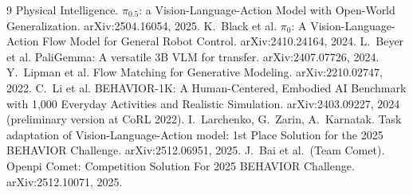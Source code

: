 \documentclass[10pt]{article}
\begin{document}
\begin{thebibliography}{9}\small
{} Physical Intelligence. $\pi_{0.5}$: a Vision-Language-Action Model with Open-World Generalization. arXiv:2504.16054, 2025.
 K.~Black et al. $\pi_0$: A Vision-Language-Action Flow Model for General Robot Control. arXiv:2410.24164, 2024.
 L.~Beyer et al. PaliGemma: A versatile 3B VLM for transfer. arXiv:2407.07726, 2024.
 Y.~Lipman et al. Flow Matching for Generative Modeling. arXiv:2210.02747, 2022.
 C.~Li et al. BEHAVIOR-1K: A Human-Centered, Embodied AI Benchmark with 1,000 Everyday Activities and Realistic Simulation. arXiv:2403.09227, 2024 (preliminary version at CoRL 2022).
 I.~Larchenko, G.~Zarin, A.~Karnatak. Task adaptation of Vision-Language-Action model: 1st Place Solution for the 2025 BEHAVIOR Challenge. arXiv:2512.06951, 2025.
 J.~Bai et al.\ (Team Comet). Openpi Comet: Competition Solution For 2025 BEHAVIOR Challenge. arXiv:2512.10071, 2025.
\end{thebibliography}
\end{document}

